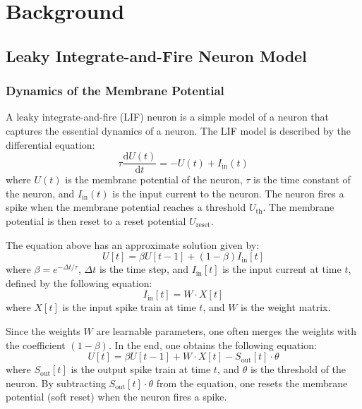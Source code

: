 \chapter{Background}
\label{chap:background}

\section{Leaky Integrate-and-Fire Neuron Model}
\label{sec:lif}

    \subsection{Dynamics of the Membrane Potential}
    \label{subsec:lif_dynamics}
        A leaky integrate-and-fire (LIF) neuron is a simple model of a neuron that captures the essential dynamics of a neuron. The LIF model is described by the differential equation:
        \begin{equation}
            \tau \frac{\mathrm{d}U(t)}{\mathrm{d}t} = -U(t) + I_{\text{in}}(t)
        \end{equation}
        where $U(t)$ is the membrane potential of the neuron, $\tau$ is the time constant of the neuron, and $I_{\text{in}}(t)$ is the input current to the neuron. The neuron fires a spike when the membrane potential reaches a threshold $U_{\text{th}}$. The membrane potential is then reset to a reset potential $U_{\text{reset}}$. 

        The equation above has an approximate solution given by:
        \begin{equation}
            U[t] = \beta U[t-1] + (1 - \beta) I_{\text{in}}[t]
        \end{equation}
        where $\beta = e^{-\Delta t/\tau}$, $\Delta t$ is the time step, and $I_{\text{in}}[t]$ is the input current at time $t$, defined by the following equation:
        \begin{equation}
            I_{\text{in}}[t] = W\cdot X[t]
        \end{equation}
        where $X[t]$ is the input spike train at time $t$, and $W$ is the weight matrix. 

        Since the weights $W$ are learnable parameters, one often merges the weights with the coefficient $(1 - \beta)$. 
        In the end, one obtains the following equation:
        \begin{equation}
            U[t] = \beta U[t-1] + W\cdot X[t] - S_{\text{out}}[t]\cdot\theta
        \end{equation}
        where $S_{\text{out}}[t]$ is the output spike train at time $t$, and $\theta$ is the threshold of the neuron. 
        By subtracting $S_{\text{out}}[t]\cdot\theta$ from the equation, one resets the membrane potential (soft reset) when the neuron fires a spike.

